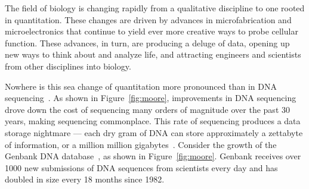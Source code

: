 The field of biology is changing rapidly from a qualitative
discipline to one rooted in quantitation.  These changes are driven
by advances in microfabrication and microelectronics that continue
to yield ever more creative ways to probe cellular function. These
advances, in turn, are producing a deluge of data, opening up new
ways to think about and analyze life, and attracting engineers and
scientists from other disciplines into biology.

Nowhere is this sea change of quantitation more pronounced than in
DNA sequencing~\cite{shendure2004advanced}.  As shown in
Figure~\vref{fig:moore}, improvements in DNA sequencing drove down
the cost of sequencing many orders of magnitude over the past 30
years, making sequencing commonplace.  This rate of sequencing
produces a data storage nightmare --- each dry gram of DNA can store
approximately a zettabyte of information, or a million million
gigabytes~\cite{reif2002computing}.  Consider the growth of the
Genbank DNA database~\cite{benson2006genbank}, as shown in
Figure~\vref{fig:moore}.  Genbank receives over 1000 new submissions
of DNA sequences from scientists every day and has doubled in size
every 18 months since 1982.


